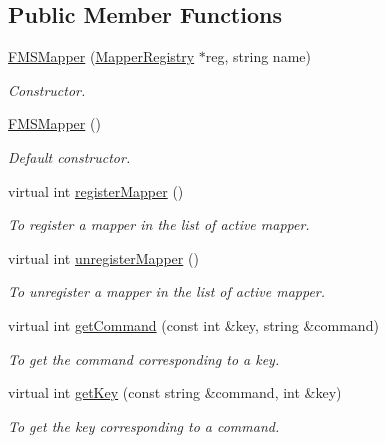 \subsection*{Public Member Functions}
\begin{DoxyCompactItemize}
\item 
\hyperlink{classFMSMapper_a2e076abc50256b19b6e7a082deae0e6c}{FMSMapper} (\hyperlink{classMapperRegistry}{MapperRegistry} $\ast$reg, string name)
\begin{DoxyCompactList}\small\item\em Constructor. \item\end{DoxyCompactList}\item 
\hypertarget{classFMSMapper_afbfc063a1ec1b5959497a1d5e094e0ab}{
\hyperlink{classFMSMapper_afbfc063a1ec1b5959497a1d5e094e0ab}{FMSMapper} ()}
\label{classFMSMapper_afbfc063a1ec1b5959497a1d5e094e0ab}

\begin{DoxyCompactList}\small\item\em Default constructor. \item\end{DoxyCompactList}\item 
virtual int \hyperlink{classFMSMapper_a9bc0c707f78b3b77bd5e12c2adca8b3c}{registerMapper} ()
\begin{DoxyCompactList}\small\item\em To register a mapper in the list of active mapper. \item\end{DoxyCompactList}\item 
virtual int \hyperlink{classFMSMapper_a6d775c27ca0443e6969c857eb2b87377}{unregisterMapper} ()
\begin{DoxyCompactList}\small\item\em To unregister a mapper in the list of active mapper. \item\end{DoxyCompactList}\item 
virtual int \hyperlink{classFMSMapper_aee31b7ad546a67dab0c5e6309fbfd829}{getCommand} (const int \&key, string \&command)
\begin{DoxyCompactList}\small\item\em To get the command corresponding to a key. \item\end{DoxyCompactList}\item 
virtual int \hyperlink{classFMSMapper_ae325ab9b7dedff767c751a57cde29159}{getKey} (const string \&command, int \&key)
\begin{DoxyCompactList}\small\item\em To get the key corresponding to a command. \item\end{DoxyCompactList}\end{DoxyCompactItemize}


